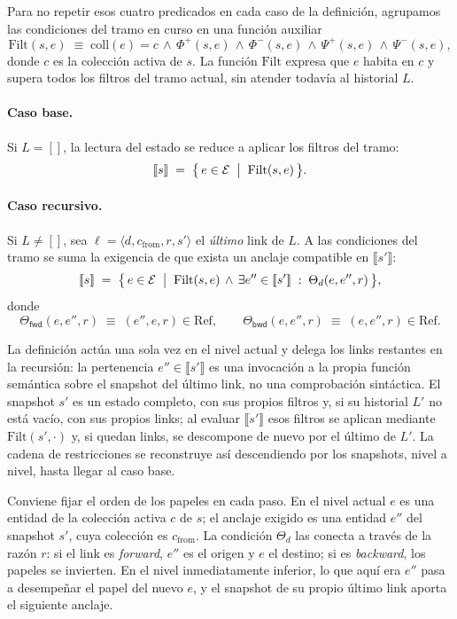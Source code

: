 Para no repetir esos cuatro predicados en cada caso de la definición, agrupamos las condiciones del tramo en
curso en una función auxiliar
\[
  \mathrm{Filt}(s, e) \;\equiv\; \mathrm{coll}(e) = c \,\land\, \Phi^{+}(s,e) \,\land\, \Phi^{-}(s,e) \,\land\, \Psi^{+}(s,e) \,\land\, \Psi^{-}(s,e),
\]
donde $c$ es la colección activa de $s$. La función $\mathrm{Filt}$ expresa que $e$ habita en $c$ y supera
todos los filtros del tramo actual, sin atender todavía al historial $L$.

\paragraph{Caso base.} Si $L = []$, la lectura del estado se reduce a aplicar los filtros del tramo:
\[
  \llbracket s \rrbracket \;=\; \bigl\{\, e \in \mathcal{E} \;\bigm|\; \mathrm{Filt}(s, e) \,\bigr\}.
\]

\paragraph{Caso recursivo.} Si $L \neq []$, sea $\ell = \langle d, c_{\text{from}}, r, s' \rangle$ el
\emph{último} link de $L$. A las condiciones del tramo se suma la exigencia de que exista un anclaje
compatible en $\llbracket s' \rrbracket$:
\[
  \llbracket s \rrbracket \;=\; \bigl\{\, e \in \mathcal{E} \;\bigm|\; \mathrm{Filt}(s, e) \,\land\, \exists e'' \in \llbracket s' \rrbracket \;:\; \Theta_{d}(e, e'', r) \,\bigr\},
\]
donde
\[
  \Theta_{\mathsf{fwd}}(e, e'', r) \;\equiv\; (e'', e, r) \in \mathrm{Ref}, \qquad
  \Theta_{\mathsf{bwd}}(e, e'', r) \;\equiv\; (e, e'', r) \in \mathrm{Ref}.
\]

La definición actúa una sola vez en el nivel actual y delega los links restantes en la recursión: la
pertenencia $e'' \in \llbracket s' \rrbracket$ es una invocación a la propia función semántica sobre el
snapshot del último link, no una comprobación sintáctica. El snapshot $s'$ es un estado completo, con sus
propios filtros y, si su historial $L'$ no está vacío, con sus propios links; al evaluar $\llbracket s'
\rrbracket$ esos filtros se aplican mediante $\mathrm{Filt}(s', \cdot)$ y, si quedan links, se descompone de
nuevo por el último de $L'$. La cadena de restricciones se reconstruye así descendiendo por los snapshots,
nivel a nivel, hasta llegar al caso base.

Conviene fijar el orden de los papeles en cada paso. En el nivel actual $e$ es una entidad de la colección
activa $c$ de $s$; el anclaje exigido es una entidad $e''$ del snapshot $s'$, cuya colección es
$c_{\text{from}}$. La condición $\Theta_d$ las conecta a través de la razón $r$: si el link es
\textit{forward}, $e''$ es el origen y $e$ el destino; si es \textit{backward}, los papeles se invierten.
En el nivel inmediatamente inferior, lo que aquí era $e''$ pasa a desempeñar el papel del nuevo $e$, y el
snapshot de su propio último link aporta el siguiente anclaje.

